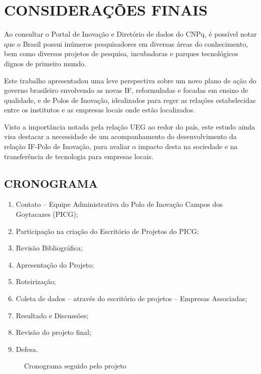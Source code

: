 \chapter{CONSIDERAÇÕES FINAIS}
\thispagestyle{empty}

Ao consultar o Portal de Inovação e Diretório de dados do CNPq, é possível notar que o Brasil possui inúmeros pesquisadores em diversas áreas do conhecimento, bem como diversos projetos de pesquisa, incubadoras e parques tecnológicos dignos de primeiro mundo.

Este trabalho apresentadou uma leve perspectiva sobre um novo plano de ação do governo brasileiro envolvendo as novas IF, reformuladas e focadas em ensino de qualidade, e de Polos de Inovação, idealizados para reger as relações estabelecidas entre os institutos e as empresas locais onde estão localizados.

Visto a importância notada pela relação UEG ao redor do país, este estudo ainda visa destacar a necessidade de um acompanhamento do desenvolvimento da relação IF-Polo de Inovação, para avaliar o impacto desta na sociedade e na transferência de tecnologia para empresas locais.

\section{CRONOGRAMA}

\begin{enumerate}
  \item{Contato – Equipe Administrativa do Polo de Inovação Campos dos Goytacazes (PICG);}
  \item{Participação na criação do Escritório de Projetos do PICG;}
  \item{Revisão Bibliográfica;}
  \item{Apresentação do Projeto;}
  \item{Roteirização;}
  \item{Coleta de dados – através do escritório de projetos – Empresas Associadas;}
  \item{Resultado e Discussões;}
  \item{Revisão do projeto final;}
  \item{Defesa.}
\end{enumerate}

\begin{figure}[ht]
    \centering
    \caption{Cronograma seguido pelo projeto}
    \label{crescimento_odf}
\end{figure}
